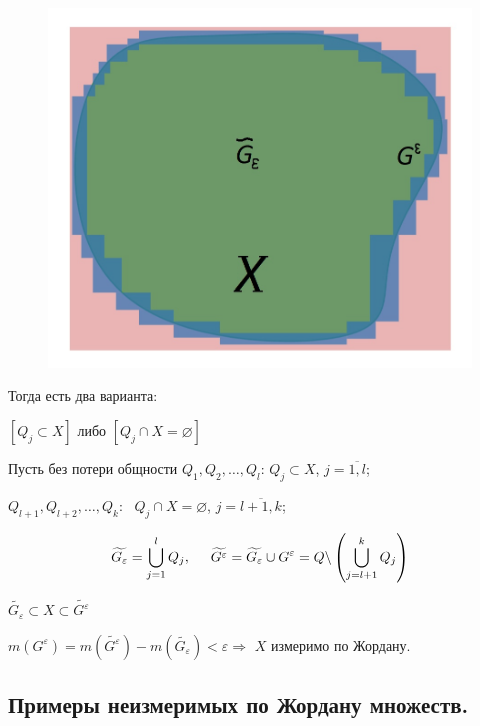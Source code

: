 \documentclass[a4paper,12pt]{article} %
\begin{document}
\begin{figure}
	\includegraphics[scale=0.25]{Q(Клет).jpg}
\end{figure}

Тогда есть два варианта:

$\left[Q_j \subset X\right]$ либо $\left[Q_j \cap X = \varnothing\right]$

\vspace{2mm}

Пусть без потери общности $Q_1, Q_2, \ldots, Q_l$: $\text{} Q_j \subset X$, $j = \overline{1,l}$;

$Q_{l+1}, Q_{l+2}, \ldots, Q_k:\text{ } Q_j \cap X = \varnothing$, $j = \overline{l+1,k}$;


\begin{equation*}
	\widetilde{G_{\varepsilon}} = \bigcup\limits_{j = 1}^l Q_j, \hspace{5mm} \widetilde{G^{\varepsilon}} = \widetilde{G_{\varepsilon}} \cup G^{\varepsilon} = Q \backslash \left(\bigcup\limits_{j = l + 1}^k Q_j\right)
\end{equation*}


$\widetilde{G_{\varepsilon}} \subset X \subset \widetilde{G^{\varepsilon}}$

$m(G^{\varepsilon}) = m(\widetilde{G^{\varepsilon}}) - m(\widetilde{G_{\varepsilon}}) < \varepsilon \Rightarrow$ $X$ измеримо по Жордану.\\

\subsection{Примеры неизмеримых по Жордану множеств.}
\end{document}
